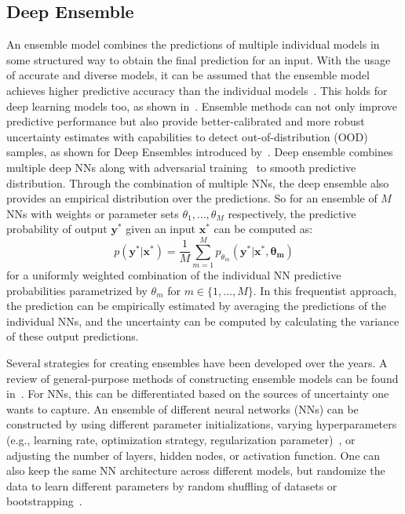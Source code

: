     \subsection{Deep Ensemble}\label{Deepsemble}
    An ensemble model combines the predictions of multiple individual models in some structured way to obtain the final prediction for an input. With the usage of accurate and diverse models, it can be assumed that the ensemble model achieves higher predictive accuracy than the individual models~\cite{EnsembleNN}. This holds for deep learning models too, as shown in~\cite{EnsembleNN, EnsembleNN2, EnsembleNN3}. Ensemble methods can not only improve predictive performance but also provide better-calibrated and more robust uncertainty estimates with capabilities to detect out-of-distribution (OOD) samples, as shown for Deep Ensembles introduced by~\cite{DeepEnsembleUQ}. Deep ensemble combines multiple deep NNs along with adversarial training~\cite{Adversarial} to smooth predictive distribution. Through the combination of multiple NNs, the deep ensemble also provides an empirical distribution over the predictions. So for an ensemble of $M$ NNs with weights or parameter sets $\theta_1, \ldots, \theta_M$ respectively, the predictive probability of output $\mathbf{y^*}$ given an input $\mathbf{x^*}$ can be computed as:
    \begin{equation}\label{EnsemblePred}
        p(\mathbf{y^*|x^*}) = \frac{1}{M} \sum_{m=1}^M p_{\theta_m}(\mathbf{y^*|x^*, \theta_m})
    \end{equation}
    for a uniformly weighted combination of the individual NN predictive probabilities parametrized by $\theta_m$ for $m \in \{1, \ldots, M\}$. In this frequentist approach, the prediction can be empirically estimated by averaging the predictions of the individual NNs, and the uncertainty can be computed by calculating the variance of these output predictions.
    \newline

    Several strategies for creating ensembles have been developed over the years. A review of general-purpose methods of constructing ensemble models can be found in~\cite{EnsembleReview}. For NNs, this can be differentiated based on the sources of uncertainty one wants to capture. An ensemble of different neural networks (NNs) can be constructed by using different parameter initializations, varying hyperparameters (e.g., learning rate, optimization strategy, regularization parameter)~\cite{HyperparEnsUnc}, or adjusting the number of layers, hidden nodes, or activation function. One can also keep the same NN architecture across different models, but randomize the data to learn different parameters by random shuffling of datasets or bootstrapping~\cite{DeepEnsembleUQ, NeuBoots}.
    \newline

